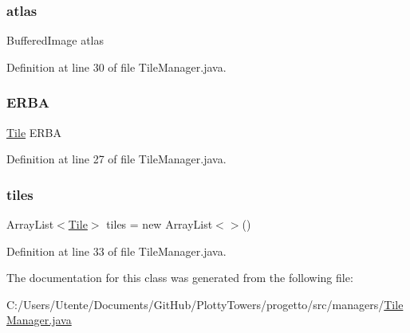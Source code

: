 \subsubsection{\texorpdfstring{atlas}{atlas}}
{\footnotesize\ttfamily Buffered\+Image atlas}



Definition at line 30 of file Tile\+Manager.\+java.

\mbox{\label{classmanagers_1_1_tile_manager_a976f8123c1fc10e66de7e7f98570d45a}} 
\subsubsection{\texorpdfstring{E\+R\+BA}{ERBA}}
{\footnotesize\ttfamily \hyperlink{classobjects_1_1_tile}{Tile} E\+R\+BA}



Definition at line 27 of file Tile\+Manager.\+java.

\mbox{\label{classmanagers_1_1_tile_manager_a4b6ed1e7aa1fffacfc6271483b48c304}} 
\subsubsection{\texorpdfstring{tiles}{tiles}}
{\footnotesize\ttfamily Array\+List$<$\hyperlink{classobjects_1_1_tile}{Tile}$>$ tiles = new Array\+List$<$$>$()}



Definition at line 33 of file Tile\+Manager.\+java.



The documentation for this class was generated from the following file\+:\begin{DoxyCompactItemize}
\item 
C\+:/\+Users/\+Utente/\+Documents/\+Git\+Hub/\+Plotty\+Towers/progetto/src/managers/\hyperlink{_tile_manager_8java}{Tile\+Manager.\+java}\end{DoxyCompactItemize}
